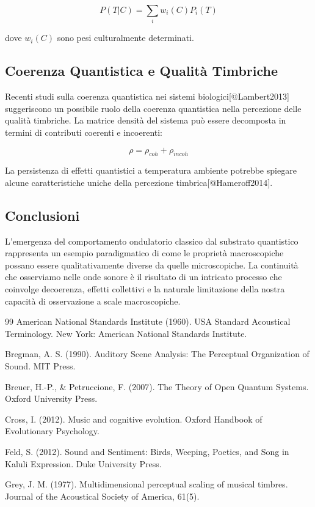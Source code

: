 \documentclass{gs-adonis}
\begin{document}
\[P(T|C) = \sum_i w_i(C)P_i(T)\]

dove \(w_i(C)\) sono pesi culturalmente determinati.

\subsection{Coerenza Quantistica e Qualità
Timbriche}\label{coerenza-quantistica-e-qualituxe0-timbriche}

Recenti studi sulla coerenza quantistica nei sistemi
biologici{[}@Lambert2013{]} suggeriscono un possibile ruolo della
coerenza quantistica nella percezione delle qualità timbriche. La
matrice densità del sistema può essere decomposta in termini di
contributi coerenti e incoerenti:

\[\rho = \rho_{coh} + \rho_{incoh}\]

La persistenza di effetti quantistici a temperatura ambiente potrebbe
spiegare alcune caratteristiche uniche della percezione
timbrica{[}@Hameroff2014{]}.

\subsection{Conclusioni}\label{conclusioni}

L'emergenza del comportamento ondulatorio classico dal substrato
quantistico rappresenta un esempio paradigmatico di come le proprietà
macroscopiche possano essere qualitativamente diverse da quelle
microscopiche. La continuità che osserviamo nelle onde sonore è il
risultato di un intricato processo che coinvolge decoerenza, effetti
collettivi e la naturale limitazione della nostra capacità di
osservazione a scale macroscopiche.

99 American National Standards Institute (1960). USA Standard Acoustical
Terminology. New York: American National Standards Institute.

Bregman, A. S. (1990). Auditory Scene Analysis: The Perceptual
Organization of Sound. MIT Press.

Breuer, H.-P., \& Petruccione, F. (2007). The Theory of Open Quantum
Systems. Oxford University Press.

Cross, I. (2012). Music and cognitive evolution. Oxford Handbook of
Evolutionary Psychology.

Feld, S. (2012). Sound and Sentiment: Birds, Weeping, Poetics, and Song
in Kaluli Expression. Duke University Press.

Grey, J. M. (1977). Multidimensional perceptual scaling of musical
timbres. Journal of the Acoustical Society of America, 61(5).
\end{document}
